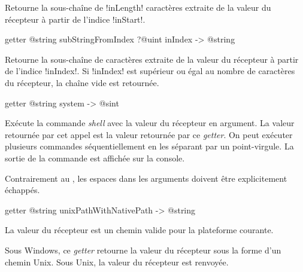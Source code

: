 Retourne la sous-chaîne de \ggs!inLength! caractères extraite de la valeur du récepteur à partir de l'indice \ggs!inStart!.







\begin{galgasbox}
getter @string subStringFromIndex ?@uint inIndex -> @string
\end{galgasbox}

Retourne la sous-chaîne de caractères extraite de la valeur du récepteur à partir de l'indice \ggs!inIndex!. Si \ggs!inIndex! est supérieur ou égal au nombre de caractères du récepteur, la chaîne vide est retournée.







\begin{galgasbox}
getter @string system -> @sint
\end{galgasbox}


Exécute la commande \emph{shell} avec la valeur du récepteur en argument. La valeur retournée par cet appel est la valeur retournée par ce \emph{getter}. On peut exécuter plusieurs commandes séquentiellement en les séparant par un point-virgule. La sortie de la commande est affichée sur la console.

Contrairement au , les espaces dans les arguments doivent être explicitement échappés.





\begin{galgasbox}
getter @string unixPathWithNativePath -> @string
\end{galgasbox}

La valeur du récepteur est un chemin valide pour la plateforme courante.

Sous Windows, ce \emph{getter} retourne la valeur du récepteur sous la forme d'un chemin Unix. Sous Unix, la valeur du récepteur est renvoyée.














